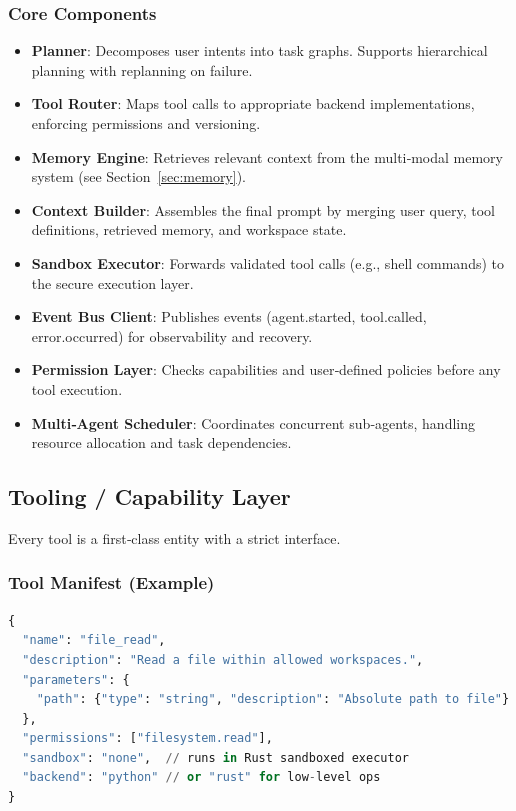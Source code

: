 \documentclass[12pt,a4paper]{article}
\begin{document}
\subsubsection{Core Components}
\begin{itemize}[leftmargin=*]
    \item \textbf{Planner}: Decomposes user intents into task graphs. Supports hierarchical planning with replanning on failure.
    \item \textbf{Tool Router}: Maps tool calls to appropriate backend implementations, enforcing permissions and versioning.
    \item \textbf{Memory Engine}: Retrieves relevant context from the multi‑modal memory system (see Section~\ref{sec:memory}).
    \item \textbf{Context Builder}: Assembles the final prompt by merging user query, tool definitions, retrieved memory, and workspace state.
    \item \textbf{Sandbox Executor}: Forwards validated tool calls (e.g., shell commands) to the secure execution layer.
    \item \textbf{Event Bus Client}: Publishes events (agent.started, tool.called, error.occurred) for observability and recovery.
    \item \textbf{Permission Layer}: Checks capabilities and user‑defined policies before any tool execution.
    \item \textbf{Multi‑Agent Scheduler}: Coordinates concurrent sub‑agents, handling resource allocation and task dependencies.
\end{itemize}

\subsection{Tooling / Capability Layer}
Every tool is a first‑class entity with a strict interface.

\subsubsection{Tool Manifest (Example)}
\begin{lstlisting}[language=Python, caption=Tool definition schema]
{
  "name": "file_read",
  "description": "Read a file within allowed workspaces.",
  "parameters": {
    "path": {"type": "string", "description": "Absolute path to file"}
  },
  "permissions": ["filesystem.read"],
  "sandbox": "none",  // runs in Rust sandboxed executor
  "backend": "python" // or "rust" for low-level ops
}
\end{lstlisting}
\end{document}
